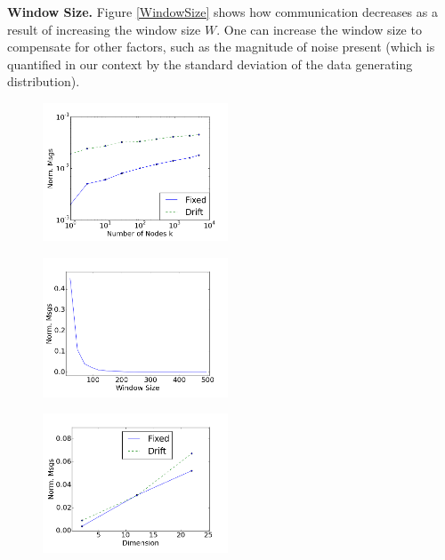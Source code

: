 \noindent\textbf{Window Size.}
Figure \ref{WindowSize} shows how communication decreases as a result
of increasing the window size $W$.  One can increase the window size to compensate 
for other factors, such as the magnitude of 
noise present (which is quantified in our context by the standard deviation of the
data generating distribution).


\begin{figure}
\centering
\begin{minipage}{.29\textwidth}
\includegraphics[width=55mm]{graphics/Nodes.png}
  \label{Nodes}
\end{minipage}%
\hfill
\begin{minipage}{.29\textwidth}
  \includegraphics[width=55mm]{graphics/WindowSize.png}
  \label{WindowSize}
\end{minipage}
\hfill
\begin{minipage}{.35\textwidth}
  \includegraphics[width=55mm]{graphics/Dimension.png}
  \label{Dimension}
\end{minipage}
\end{figure}

